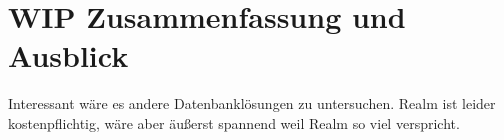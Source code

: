 \chapter{\label{chap:fazit}WIP Zusammenfassung und Ausblick}
Interessant wäre es andere Datenbanklösungen zu untersuchen.
Realm ist leider kostenpflichtig, wäre aber äußerst spannend weil Realm so viel verspricht.